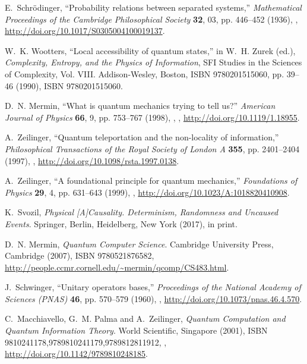 \documentclass{ws-book9x6}
\begin{document}
\begin{thebibliography}{24}
E.~Schr{\"{o}}dinger, \enquote{Probability relations between separated
  systems,} \emph{Mathematical Proceedings of the Cambridge Philosophical
  Society} \textbf{32}, 03, pp. 446--452 (1936),
  ,
  \url{http://doi.org/10.1017/S0305004100019137}.

W.~K. Wootters, \enquote{Local accessibility of quantum states,} in W.~H. Zurek
  (ed.), \emph{Complexity, Entropy, and the Physics of Information}, {SFI}
  Studies in the Sciences of Complexity, Vol. {VIII}.
\newblock Addison-Wesley, Boston, ISBN 9780201515060, pp. 39--46 (1990), ISBN
  9780201515060.

D.~N. Mermin, \enquote{What is quantum mechanics trying to tell us?}
  \emph{American Journal of Physics} \textbf{66}, 9, pp. 753--767 (1998),
  ,
  \href{http://arxiv.org/abs/arXiv:quant-ph/9801057}{},
  \url{http://doi.org/10.1119/1.18955}.

A.~Zeilinger, \enquote{Quantum teleportation and the non-locality of
  information,} \emph{Philosophical Transactions of the Royal Society of London
  A} \textbf{355}, pp. 2401--2404 (1997), ,
  \url{http://doi.org/10.1098/rsta.1997.0138}.

A.~Zeilinger, \enquote{A foundational principle for quantum mechanics,}
  \emph{Foundations of Physics} \textbf{29}, 4, pp. 631--643 (1999),
  , \url{http://doi.org/10.1023/A:1018820410908}.

K.~Svozil, \emph{Physical [A]Causality. {D}eterminism, Randomness and Uncaused
  Events}.
\newblock Springer, Berlin, Heidelberg, New York (2017), in print.

D.~N. Mermin, \emph{Quantum Computer Science}.
\newblock Cambridge University Press, Cambridge (2007), ISBN 9780521876582,
  \url{http://people.ccmr.cornell.edu/~mermin/qcomp/CS483.html}.

J.~Schwinger, \enquote{Unitary operators bases,} \emph{Proceedings of the
  National Academy of Sciences (PNAS)} \textbf{46}, pp. 570--579 (1960),
  , \url{http://doi.org/10.1073/pnas.46.4.570}.

C.~Macchiavello, G.~M. Palma and A.~Zeilinger, \emph{Quantum Computation and
  Quantum Information Theory}.
\newblock World Scientific, Singapore (2001), ISBN
  9810241178,9789810241179,9789812811912, ,
  \url{http://doi.org/10.1142/9789810248185}.

\end{thebibliography}
\end{document}
